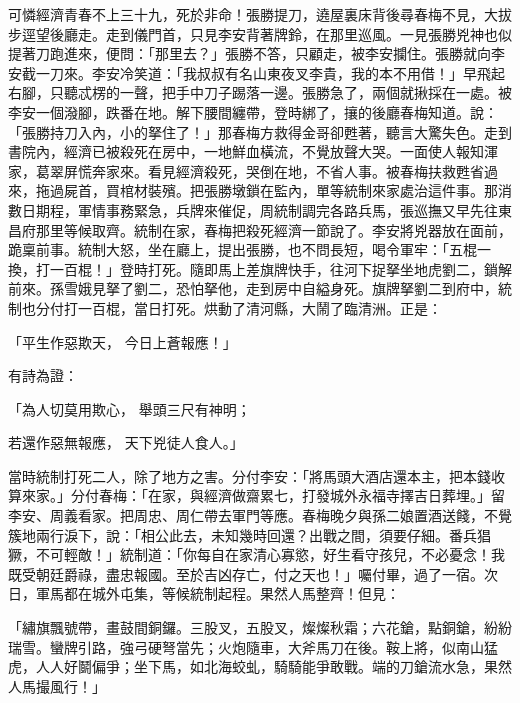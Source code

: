 \begin{showcontents}{}
可憐經濟青春不上三十九，死於非命！張勝提刀，遶屋裏床背後尋春梅不見，大拔步逕望後廳走。走到儀門首，只見李安背著牌鈴，在那里巡風。一見張勝兇神也似提著刀跑進來，便問：「那里去？」張勝不答，只顧走，被李安攔住。張勝就向李安截一刀來。李安冷笑道：「我叔叔有名山東夜叉李貴，我的本不用借！」早飛起右腳，只聽忒楞的一聲，把手中刀子踢落一邊。張勝急了，兩個就揪採在一處。被李安一個潑腳，跌番在地。解下腰間纏帶，登時綁了，攘的後廳春梅知道。說：「張勝持刀入內，小的拏住了！」那春梅方救得金哥卻甦著，聽言大驚失色。走到書院內，經濟已被殺死在房中，一地鮮血橫流，不覺放聲大哭。一面使人報知渾家，葛翠屏慌奔家來。看見經濟殺死，哭倒在地，不省人事。被春梅扶救甦省過來，拖過屍首，買棺材裝殯。把張勝墩鎖在監內，單等統制來家處治這件事。那消數日期程，軍情事務緊急，兵牌來催促，周統制調完各路兵馬，張巡撫又早先往東昌府那里等候取齊。統制在家，春梅把殺死經濟一節說了。李安將兇器放在面前，跪稟前事。統制大怒，坐在廳上，提出張勝，也不問長短，喝令軍牢：「五棍一換，打一百棍！」登時打死。隨即馬上差旗牌快手，往河下捉拏坐地虎劉二，鎖解前來。孫雪娥見拏了劉二，恐怕拏他，走到房中自縊身死。旗牌拏劉二到府中，統制也分付打一百棍，當日打死。烘動了清河縣，大鬧了臨清洲。正是：

「平生作惡欺天，  今日上蒼報應！」

有詩為證：

「為人切莫用欺心，  舉頭三尺有神明；

若還作惡無報應，  天下兇徒人食人。」

當時統制打死二人，除了地方之害。分付李安：「將馬頭大酒店還本主，把本錢收算來家。」分付春梅：「在家，與經濟做齋累七，打發城外永福寺擇吉日葬埋。」留李安、周義看家。把周忠、周仁帶去軍門等應。春梅晚夕與孫二娘置酒送餞，不覺簇地兩行淚下，說：「相公此去，未知幾時回還？出戰之間，須要仔細。番兵猖獗，不可輕敵！」統制道：「你每自在家清心寡慾，好生看守孩兒，不必憂念！我既受朝廷爵祿，盡忠報國。至於吉凶存亡，付之天也！」囑付畢，過了一宿。次日，軍馬都在城外屯集，等候統制起程。果然人馬整齊！但見：

「繡旗飄號帶，畫鼓間銅鑼。三股叉，五股叉，燦燦秋霜；六花鎗，點銅鎗，紛紛瑞雪。蠻牌引路，強弓硬弩當先；火炮隨車，大斧馬刀在後。鞍上將，似南山猛虎，人人好鬬偏爭；坐下馬，如北海蛟虬，騎騎能爭敢戰。端的刀鎗流水急，果然人馬撮風行！」


\end{showcontents}
